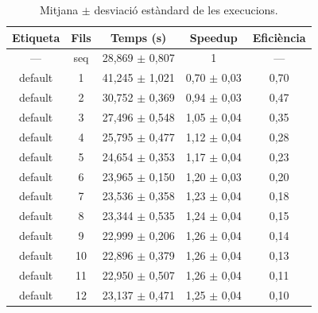 \begin{table}[H]
\centering
\begin{tabular}{|c|c|c|c|c|}
\hline
\textbf{Etiqueta} & \textbf{Fils} & \textbf{Temps (s)} & \textbf{Speedup} & \textbf{Eficiència} \\ \hline
--- & seq & 28,869 $\pm$ 0,807 & 1 & --- \\ \hline
default & 1 & 41,245 $\pm$ 1,021 & 0,70 $\pm$ 0,03 & 0,70 \\ \hline
default & 2 & 30,752 $\pm$ 0,369 & 0,94 $\pm$ 0,03 & 0,47 \\ \hline
default & 3 & 27,496 $\pm$ 0,548 & 1,05 $\pm$ 0,04 & 0,35 \\ \hline
default & 4 & 25,795 $\pm$ 0,477 & 1,12 $\pm$ 0,04 & 0,28 \\ \hline
default & 5 & 24,654 $\pm$ 0,353 & 1,17 $\pm$ 0,04 & 0,23 \\ \hline
default & 6 & 23,965 $\pm$ 0,150 & 1,20 $\pm$ 0,03 & 0,20 \\ \hline
default & 7 & 23,536 $\pm$ 0,358 & 1,23 $\pm$ 0,04 & 0,18 \\ \hline
default & 8 & 23,344 $\pm$ 0,535 & 1,24 $\pm$ 0,04 & 0,15 \\ \hline
default & 9 & 22,999 $\pm$ 0,206 & 1,26 $\pm$ 0,04 & 0,14 \\ \hline
default & 10 & 22,896 $\pm$ 0,379 & 1,26 $\pm$ 0,04 & 0,13 \\ \hline
default & 11 & 22,950 $\pm$ 0,507 & 1,26 $\pm$ 0,04 & 0,11 \\ \hline
default & 12 & 23,137 $\pm$ 0,471 & 1,25 $\pm$ 0,04 & 0,10 \\ \hline
\end{tabular}
\caption{Mitjana $\pm$ desviació estàndard de les execucions.}
\label{tab:resultats}
\end{table}
